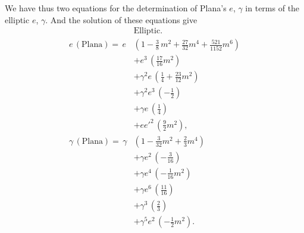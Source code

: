 \documentclass[11pt]{article}
\begin{document}
We have thus two equations for the determination of Plana's $e$,
$\gamma$ in terms of the elliptic $e$, $\gamma$. And the solution of
these equations give
\[
\renewcommand{\arraystretch}{1.2}
\begin{array}{ll}
& \text{Elliptic.} \\
e\,(\text{Plana}) =\, e & \left(1 - \tfrac{3}{8}\,m^{2} + \tfrac{27}{32}m^{4} + \tfrac{521}{1152}m^{6}\right) \\
& + e^{3}\,\left(\tfrac{17}{16}m^{2}\right) \\
& + \gamma^{2}e\,\left(\tfrac{1}{4} + \tfrac{23}{12}m^{2}\right) \\
& + \gamma^{2}e^{3}\,\left(-\tfrac{1}{2}\right) \\
& + \gamma e\,\left(\tfrac{1}{4}\right) \\
& + ee'^{2}\,\left(\tfrac{9}{2}m^{2}\right), \\[4pt]
\gamma\,(\text{Plana}) =\, \gamma & \left(1 - \tfrac{3}{32}m^{2} + \tfrac{2}{3}m^{4}\right) \\
& + \gamma e^{2}\,\left(-\tfrac{3}{16}\right) \\
& + \gamma e^{4}\,\left(-\tfrac{1}{16}m^{2}\right) \\
& + \gamma e^{6}\,\left(\tfrac{11}{16}\right) \\
& + \gamma^{3}\,\left(\tfrac{2}{3}\right) \\
& + \gamma^{5}e^{2}\,\left(-\tfrac{1}{2}m^{2}\right).
\end{array}
\]
\end{document}
